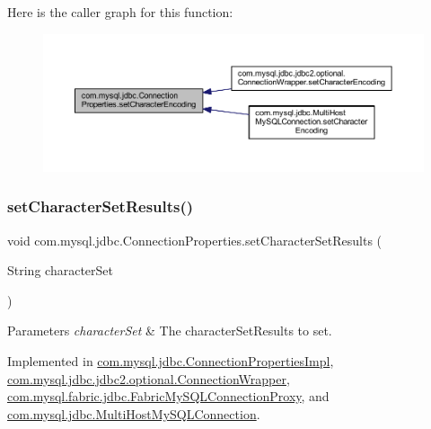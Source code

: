 Here is the caller graph for this function\+:\nopagebreak
\begin{figure}[H]
\begin{center}
\leavevmode
\includegraphics[width=350pt]{interfacecom_1_1mysql_1_1jdbc_1_1_connection_properties_ac5db9f2921918f0a5d1f55ce5e093948_icgraph}
\end{center}
\end{figure}
\mbox{\label{interfacecom_1_1mysql_1_1jdbc_1_1_connection_properties_a8279ffd124fca779625e5d1d94f32c56}} 
\subsubsection{\texorpdfstring{set\+Character\+Set\+Results()}{setCharacterSetResults()}}
{\footnotesize\ttfamily void com.\+mysql.\+jdbc.\+Connection\+Properties.\+set\+Character\+Set\+Results (\begin{DoxyParamCaption}\item[{String}]{character\+Set }\end{DoxyParamCaption})}


\begin{DoxyParams}{Parameters}
{\em character\+Set} & The character\+Set\+Results to set. \\
\hline
\end{DoxyParams}


Implemented in \mbox{\hyperlink{classcom_1_1mysql_1_1jdbc_1_1_connection_properties_impl_a27557cb0d4c7c600b6d381a432d563b8}{com.\+mysql.\+jdbc.\+Connection\+Properties\+Impl}}, \mbox{\hyperlink{classcom_1_1mysql_1_1jdbc_1_1jdbc2_1_1optional_1_1_connection_wrapper_a34e64b74d02a705c8a2e5e9d9c3f7503}{com.\+mysql.\+jdbc.\+jdbc2.\+optional.\+Connection\+Wrapper}}, \mbox{\hyperlink{classcom_1_1mysql_1_1fabric_1_1jdbc_1_1_fabric_my_s_q_l_connection_proxy_abba872c6f4c243d1ac5909015207bddc}{com.\+mysql.\+fabric.\+jdbc.\+Fabric\+My\+S\+Q\+L\+Connection\+Proxy}}, and \mbox{\hyperlink{classcom_1_1mysql_1_1jdbc_1_1_multi_host_my_s_q_l_connection_a5fa2549fbd789689d65411226fc16101}{com.\+mysql.\+jdbc.\+Multi\+Host\+My\+S\+Q\+L\+Connection}}.


